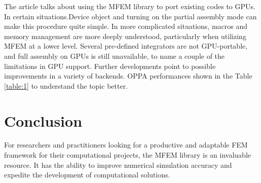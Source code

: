 \documentclass[11pt,a4paper]{article}
\begin{document}
The article talks about using the MFEM library to port existing codes to GPUs. In certain situations.Device object and turning on the partial assembly mode can make this procedure quite simple. In more complicated situations,  macros and memory management are more deeply understood, particularly when utilizing MFEM at a lower level. Several pre-defined integrators are not GPU-portable, and full assembly on GPUs is still unavailable, to name a couple of the limitations in GPU support. Further developments point to possible improvements in a variety of backends. OPPA  performances shown in the Table \ref{table:1} to understand the topic better.






\section{Conclusion}
For researchers and practitioners looking for a productive and adaptable FEM framework for their computational projects, the MFEM library is an invaluable resource. It has the ability to improve numerical simulation accuracy and expedite the development of computational solutions.



\cite{ANDERSON202142}
\end{document}
